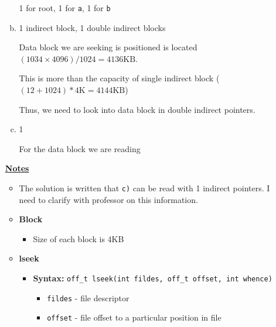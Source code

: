\documentclass[12pt]{article}
\begin{document}
\begin{enumerate}[1.]
\begin{enumerate}[a)]
        1 for root, 1 for \texttt{a}, 1 for \texttt{b}

        \item 1 indirect block, 1 double indirect blocks

        \bigskip

        Data block we are seeking is positioned is located $(1034 \times 4096)/ 1024 = 4136 \text{KB}$.

        \bigskip

        This is more than the capacity of single indirect block ($(12 + 1024) * 4 \text{K} = 4144\text{KB}$)

        \bigskip

        Thus, we need to look into data block in double indirect pointers.

        \item 1

        \bigskip

        For the data block we are reading

    \end{enumerate}

    \bigskip

    \underline{\textbf{Notes}}

    \begin{itemize}
        \item The solution is written that \texttt{c)} can be read with 1 indirect pointers.
        I need to clarify with professor on this information.
        \item \textbf{Block}

        \begin{itemize}
            \item Size of each block is 4KB
        \end{itemize}

        \item \textbf{lseek}

        \begin{itemize}
            \item \textbf{Syntax:} \texttt{off\_t lseek(int fildes, off\_t offset, int whence)}

            \begin{itemize}
                \item \texttt{fildes} - file descriptor
                \item \texttt{offset} - file offset to a particular position in file
            \end{itemize}
        \end{itemize}


\end{itemize}
\end{enumerate}
\end{document}
